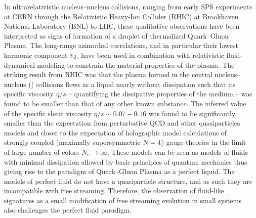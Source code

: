 \documentclass[../report.tex]{subfiles}
\begin{document}
In ultrarelativistic nucleus--nucleus collisions, ranging from early SPS experiments at CERN through the Relativistic Heavy-Ion Collider (RHIC) at Brookhaven National Laboratory (BNL) to LHC, these qualitative observations have been interpreted as signs of formation of a droplet of thermalized Quark--Gluon Plasma. The long-range azimuthal correlations, and in particular their lowest harmonic component $v_{\rm{2}}$, have been used in combination with relativistic fluid-dynamical modeling to constrain the material properties of the plasma.  The striking result from RHIC was that the plasma formed in the central nucleus--nucleus (\AuAu) collisions flows as a liquid nearly without dissipation such that its specific viscosity $\eta/s$ -- quantifying the dissipative properties of the medium -- was found to be smaller than that of any other known substance. The inferred value of the specific shear viscosity $\eta/s\sim 0.07-0.16$ \cite{} was found to be significantly smaller than the expectation from perturbative QCD and other quasiparticles models and closer to the expectation of holographic model calculations of strongly coupled (maximally supersymmetric $\rm{N}=4$) gauge theories in the limit of large number of colors $N_c \rightarrow \infty$. These models can be seen as models of fluids with minimal dissipation allowed by basic principles of quantum mechanics thus giving rise to the paradigm of Quark--Gluon Plasma as a perfect liquid. The models of perfect fluid do not have a quasiparticle structure, and as such they are incompatible with free streaming. Therefore, the observation of fluid-like signatures as a small modification of free streaming evolution in small systems also challenges the perfect fluid paradigm. 
\end{document}
